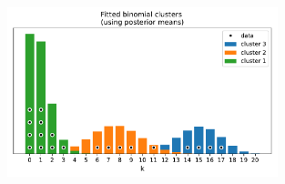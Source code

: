 \begin{figure}[h]
\centering
\includegraphics[width=0.7\textwidth]{./figs/08-binomial-clustering-posterior.pdf}
\end{figure}




